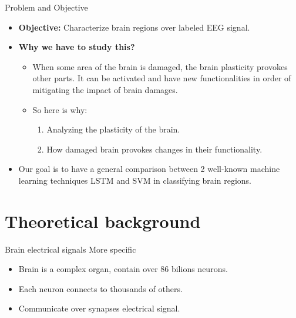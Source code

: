 \documentclass[xcolor=dvipsnames]{beamer} %
\begin{document}
	\begin{frame}{Problem and Objective}
	    \begin{itemize}
	        \item \textbf{Objective: }Characterize brain regions over labeled EEG signal.
	        \pause
	        \item \textbf{Why we have to study this?}
	        \pause
	        \begin{itemize}
	            \item When some area of the brain is damaged, the brain plasticity provokes other parts. It can be activated and have new functionalities in order of mitigating the impact of brain damages.
	            \pause
	            \item So here is why:
	            \begin{enumerate}
	                \item Analyzing the plasticity of the brain.
	                \item How damaged brain provokes changes in their functionality.
	            \end{enumerate}
            \pause
	        \end{itemize}
	        \item Our goal is to have a general comparison between 2 well-known machine learning techniques LSTM and SVM in classifying brain regions. 
	    \end{itemize}
	\end{frame}
	
	\section{Theoretical background}
	
	\begin{frame}{Brain electrical signals}
	More specific
		\begin{itemize}
		    \item Brain is a complex organ, contain over 86 bilions neurons.
		    \item Each neuron connects to thousands of others.
		    \item Communicate over synapses electrical signal.
		\end{itemize}
	\end{frame}
    
\end{document}
